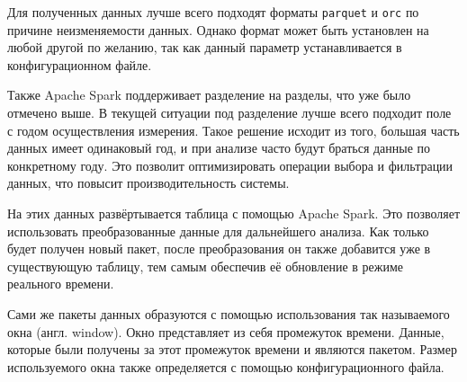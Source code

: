 Для полученных данных лучше всего подходят форматы \texttt{parquet} и \texttt{orc} по причине неизменяемости данных.
Однако формат может быть установлен на любой другой по желанию, так как данный параметр устанавливается в конфигурационном файле.

Также Apache Spark поддерживает разделение на разделы, что уже было отмечено выше.
В текущей ситуации под разделение лучше всего подходит поле с годом осуществления измерения.
Такое решение исходит из того, большая часть данных имеет одинаковый год, и при анализе часто будут браться данные по конкретному году.
Это позволит оптимизировать операции выбора и фильтрации данных, что повысит производительность системы.

На этих данных развёртывается таблица с помощью Apache Spark.
Это позволяет использовать преобразованные данные для дальнейшего анализа.
Как только будет получен новый пакет, после преобразования он также добавится уже в существующую таблицу, тем самым обеспечив её обновление в режиме реального времени.

Сами же пакеты данных образуются с помощью использования так называемого окна (англ. window).
Окно представляет из себя промежуток времени.
Данные, которые были получены за этот промежуток времени и являются пакетом.
Размер используемого окна также определяется с помощью конфигурационного файла.

